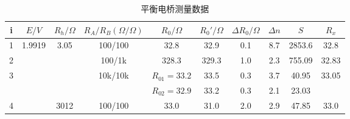 \documentclass[12pt, a4paper]{ctexart}
\begin{document}
\begin{table}[hbtp]
    \centering
    \caption{平衡电桥测量数据}
    \begin{tabular}{c|c|c|c|ccccc|c}
        \toprule
        i & $E/V$ & $R_h/\Omega$ & $R_A/R_B (\Omega/\Omega)$ & $R_0/\Omega$ & $R_0'/\Omega$ & $\Delta R_0/\Omega$ & $\Delta n$ & $S$ & $R_x$ \\
        \hline
        1 & \multirow{5}{*}{1.9919} &\multirow{4}{*}{3.05} & 100/100 & 32.8 & 32.9 & 0.1 & 8.7 & 2853.6 & 32.8 \\
        \cline{1-1}
        \cline{4-10}
        2 &  &  & 100/1k & 328.3 & 329.3 & 1.0 & 2.3 & 755.09 & 32.83 \\
        \cline{1-1}
        \cline{4-10}
        \multirow{2}{*}{3} &  &  & \multirow{2}{*}{10k/10k} & $R_{01} = 33.2$ & 33.5 & 0.3 & 3.7 & 40.95 & \multirow{2}{*}{33.05} \\
        \cline{5-9}
          &  &  &  & $R_{02} = 32.9$ & 33.2 & 0.3 & 2.1 & 23.03 &  \\
        \cline{1-1}
        \cline{3-10}
        4 &  & 3012 & 100/100 & 33.0 & 31.0 & 2.0 & 2.9 & 47.85 & 33.0 \\
        \bottomrule
    \end{tabular}
    \label{t3}
\end{table}
\end{document}
